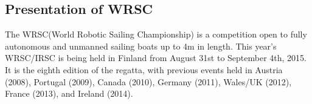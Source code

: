 \subsection{Presentation of WRSC}
The WRSC(World Robotic Sailing Championship) is a competition open to fully autonomous and unmanned sailing boats up to 4m in length. This year's WRSC/IRSC is being held in Finland from August 31st to September 4th, 2015. It is the eighth edition of the regatta, with previous events held in Austria (2008), Portugal (2009), Canada (2010), Germany (2011), Wales/UK (2012), France (2013), and Ireland (2014). 